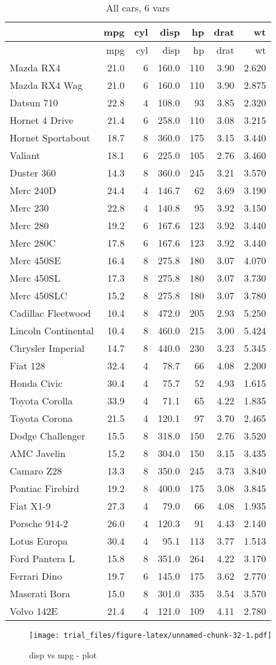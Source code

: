 \documentclass[]{article}
\begin{document}
\begin{longtable}[]{@{}lrrrrrr@{}}
\caption{All cars, 6 vars}\tabularnewline
\toprule
& mpg & cyl & disp & hp & drat & wt\tabularnewline
\midrule
\endfirsthead
\toprule
& mpg & cyl & disp & hp & drat & wt\tabularnewline
\midrule
\endhead
Mazda RX4 & 21.0 & 6 & 160.0 & 110 & 3.90 & 2.620\tabularnewline
Mazda RX4 Wag & 21.0 & 6 & 160.0 & 110 & 3.90 & 2.875\tabularnewline
Datsun 710 & 22.8 & 4 & 108.0 & 93 & 3.85 & 2.320\tabularnewline
Hornet 4 Drive & 21.4 & 6 & 258.0 & 110 & 3.08 & 3.215\tabularnewline
Hornet Sportabout & 18.7 & 8 & 360.0 & 175 & 3.15 & 3.440\tabularnewline
Valiant & 18.1 & 6 & 225.0 & 105 & 2.76 & 3.460\tabularnewline
Duster 360 & 14.3 & 8 & 360.0 & 245 & 3.21 & 3.570\tabularnewline
Merc 240D & 24.4 & 4 & 146.7 & 62 & 3.69 & 3.190\tabularnewline
Merc 230 & 22.8 & 4 & 140.8 & 95 & 3.92 & 3.150\tabularnewline
Merc 280 & 19.2 & 6 & 167.6 & 123 & 3.92 & 3.440\tabularnewline
Merc 280C & 17.8 & 6 & 167.6 & 123 & 3.92 & 3.440\tabularnewline
Merc 450SE & 16.4 & 8 & 275.8 & 180 & 3.07 & 4.070\tabularnewline
Merc 450SL & 17.3 & 8 & 275.8 & 180 & 3.07 & 3.730\tabularnewline
Merc 450SLC & 15.2 & 8 & 275.8 & 180 & 3.07 & 3.780\tabularnewline
Cadillac Fleetwood & 10.4 & 8 & 472.0 & 205 & 2.93 &
5.250\tabularnewline
Lincoln Continental & 10.4 & 8 & 460.0 & 215 & 3.00 &
5.424\tabularnewline
Chrysler Imperial & 14.7 & 8 & 440.0 & 230 & 3.23 & 5.345\tabularnewline
Fiat 128 & 32.4 & 4 & 78.7 & 66 & 4.08 & 2.200\tabularnewline
Honda Civic & 30.4 & 4 & 75.7 & 52 & 4.93 & 1.615\tabularnewline
Toyota Corolla & 33.9 & 4 & 71.1 & 65 & 4.22 & 1.835\tabularnewline
Toyota Corona & 21.5 & 4 & 120.1 & 97 & 3.70 & 2.465\tabularnewline
Dodge Challenger & 15.5 & 8 & 318.0 & 150 & 2.76 & 3.520\tabularnewline
AMC Javelin & 15.2 & 8 & 304.0 & 150 & 3.15 & 3.435\tabularnewline
Camaro Z28 & 13.3 & 8 & 350.0 & 245 & 3.73 & 3.840\tabularnewline
Pontiac Firebird & 19.2 & 8 & 400.0 & 175 & 3.08 & 3.845\tabularnewline
Fiat X1-9 & 27.3 & 4 & 79.0 & 66 & 4.08 & 1.935\tabularnewline
Porsche 914-2 & 26.0 & 4 & 120.3 & 91 & 4.43 & 2.140\tabularnewline
Lotus Europa & 30.4 & 4 & 95.1 & 113 & 3.77 & 1.513\tabularnewline
Ford Pantera L & 15.8 & 8 & 351.0 & 264 & 4.22 & 3.170\tabularnewline
Ferrari Dino & 19.7 & 6 & 145.0 & 175 & 3.62 & 2.770\tabularnewline
Maserati Bora & 15.0 & 8 & 301.0 & 335 & 3.54 & 3.570\tabularnewline
Volvo 142E & 21.4 & 4 & 121.0 & 109 & 4.11 & 2.780\tabularnewline
\bottomrule
\end{longtable}

\begin{figure}[htbp]
\centering
\texttt{[image: trial\_files/figure-latex/unnamed-chunk-32-1.pdf]}
\caption{disp vs mpg - plot}
\end{figure}
\end{document}
